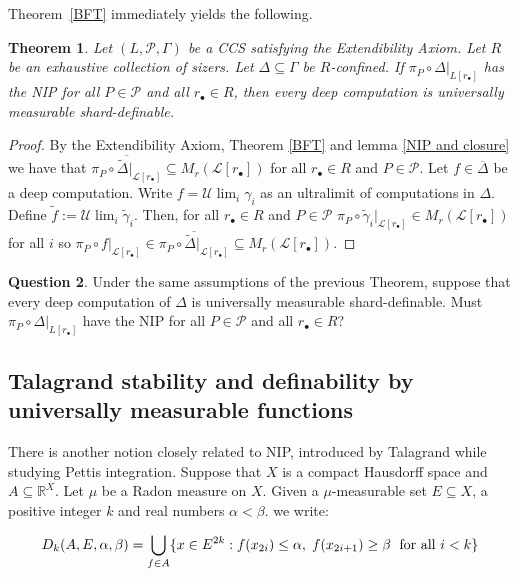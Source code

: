 \documentclass[psamsfonts]{amsart}
\newtheorem{thm}{Theorem}[section]
\theoremstyle{definition}
\newtheorem{question}[thm]{Question}
\theoremstyle{remark}
\numberwithin{equation}{section}
\begin{document}
Theorem~\ref{BFT} immediately yields the following.

\begin{thm}
    Let $(L,\mathcal P,\Gamma)$ be a CCS satisfying the Extendibility Axiom. Let $R$ be an exhaustive collection of sizers. Let $\Delta\subseteq\Gamma$ be $R$-confined. If $\pi_P\circ\Delta|_{L[r_\bullet]}$ has the NIP for all $P\in\mathcal{P}$ and all $r_{\bullet}\in R$, then every deep computation is universally measurable shard-definable.
\end{thm}

\begin{proof}
    By the Extendibility Axiom, Theorem \ref{BFT} and lemma \ref{NIP and closure} we have that $\overline{\pi_P\circ\tilde\Delta|_{\mathcal{L}[r_\bullet]}}\subseteq M_r(\mathcal{L}[r_\bullet])$ for all $r_\bullet\in R$ and $P\in\mathcal{P}$. Let $f\in\overline{\Delta}$ be a deep computation. Write $f=\mathcal{U}\lim_i\gamma_i$ as an ultralimit of computations in $\Delta$. Define $\tilde f:=\mathcal{U}\lim_i\tilde\gamma_i$. Then, for all $r_\bullet\in R$ and $P\in\mathcal{P}$ $\pi_P \circ \tilde\gamma_i|_{\mathcal{L}[r_\bullet]}\in M_r(\mathcal{L}[r_\bullet])$ for all $i$ so $\pi_P \circ f|_{\mathcal{L}[r_\bullet]}\in \overline{\pi_P\circ\tilde\Delta|_{\mathcal{L}[r_\bullet]}}\subseteq M_r(\mathcal{L}[r_\bullet])$.
\end{proof}

\begin{question}
Under the same assumptions of the previous Theorem, suppose that every deep computation of $\Delta$ is universally measurable shard-definable. Must $\pi_P\circ\Delta|_{L[r_\bullet]}$ have the NIP for all $P\in\mathcal{P}$ and all $r_{\bullet}\in R$?
\end{question}

\subsection{Talagrand stability and definability by universally measurable functions}

There is another notion closely related to NIP, introduced by Talagrand while studying Pettis integration. Suppose that $X$ is a compact Hausdorff space and $A\subseteq \mathbb{R}^X$. Let $\mu$ be a Radon measure on $X$. Given a $\mu$-measurable set $E\subseteq X$, a positive integer $k$ and real numbers $\alpha<\beta$. we write:

$$D_k(A,E,\alpha,\beta)=\bigcup_{f\in A}\{x\in E^{2k}:f(x_{2i})\leq\alpha, \hspace{1mm} f(x_{2i+1})\geq\beta \hspace{1mm}{\text{ for all }i<k} \}$$
\end{document}
